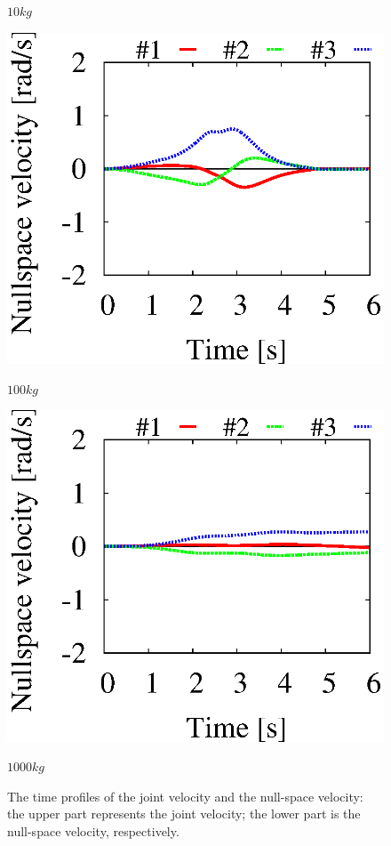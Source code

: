 \begin{figure}[t]
\begin{minipage}{0.327\linewidth}
    \footnotesize\par{\vspace{2mm}$10\unit{kg}$}
  \end{minipage}
  \begin{minipage}{0.327\linewidth}
    \centering
    \includegraphics[width=1.0\linewidth]{fig/chapter7/mass/planar/100_null.eps}
    \footnotesize\par{\vspace{2mm}$100\unit{kg}$}
  \end{minipage}
  \begin{minipage}{0.327\linewidth}
    \centering
    \includegraphics[width=1.0\linewidth]{fig/chapter7/mass/planar/1000_null.eps}
    \footnotesize\par{\vspace{2mm}$1000\unit{kg}$}
  \end{minipage}
  \caption{The time profiles of the joint velocity and the null-space velocity:
  the upper part represents the joint velocity; the lower part is the null-space velocity, respectively.}
  \label{fig:RES_3R_MOTION}
\end{figure}
